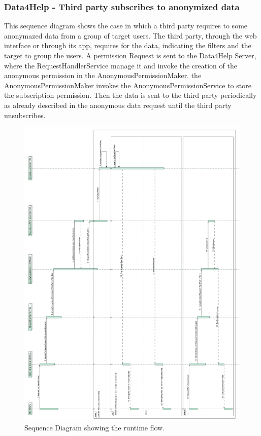 \documentclass[a4paper]{article}
\begin{document}
\subsubsection{Data4Help - Third party subscribes to anonymized data}
This sequence diagram shows the case in which a third party requires to some anonymazed data from a group of target users.
The third party, through the web interface or through its app, requires for the data, indicating the filters and the target to group the users.
A permission Request is sent to the Data4Help Server, where the RequestHandlerService manage it and invoke the creation of the anonymous permission in the AnonymousPermissionMaker.
the AnonymousPermissionMaker invokes the AnonymousPermissionService to store the subscription permission.
Then the data is sent to the third party periodically as already described in the anonymous data request until the third party unsubscribes. 

\begin{figure}[H]
    \centering
    \includegraphics[width=\linewidth]{SequenceDiagram-RequestForSubscription}
    \caption{Sequence Diagram showing the runtime flow.}
    \label{fig:my_label}
\end{figure}
\clearpage
\end{document}
